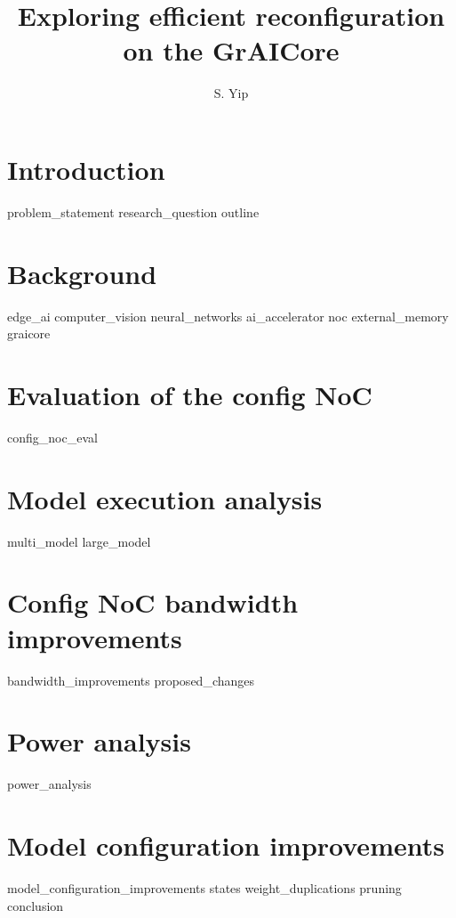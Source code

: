 \documentclass[11pt]{report}
\title{Exploring efficient reconfiguration on the GrAICore}
\author{S. Yip}
\begin{document}
\onehalfspacing




\tableofcontents

\chapter{Introduction}
{problem_statement}
{research_question}
{outline}

\chapter{Background}
{edge_ai}
{computer_vision}
{neural_networks}
{ai_accelerator}
{noc}
{external_memory}
{graicore}

\chapter{Evaluation of the config NoC}
{config_noc_eval}

\chapter{Model execution analysis}
{multi_model}
{large_model}

\chapter{Config NoC bandwidth improvements}
{bandwidth_improvements}
{proposed_changes}

\chapter{Power analysis} \label{chapter:power_analysis}
{power_analysis}

\chapter{Model configuration improvements} \label{chapter:model_configuration_improvements}
{model_configuration_improvements}
{states}
{weight_duplications}
{pruning}
{conclusion}
\end{document}
